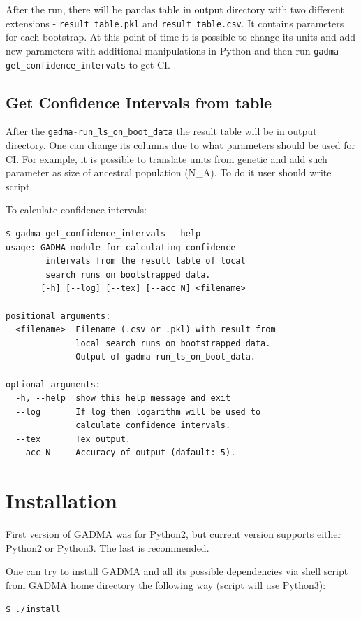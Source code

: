 \documentclass[12pt]{article}
\makeatletter
\newcommand{\py}[1]{\lstinline[language=Python, showstringspaces=False]@#1@}
\makeatother
\begin{document}
After the run, there will be pandas table in output directory with two different extensions - \py{result_table.pkl} and \py{result_table.csv}. It contains parameters for each bootstrap. At this point of time it is possible to change its units and add new parameters with additional manipulations in Python and then run \py{gadma-get_confidence_intervals} to get CI.

\subsection{Get Confidence Intervals from table}
After the \py{gadma-run_ls_on_boot_data} the result table will be in output directory. One can change its columns due to what parameters should be used for CI. For example, it is possible to translate units from genetic and add such parameter as size of ancestral population (N\_A). To do it user should write script.

To calculate confidence intervals:
\begin{lstlisting}
$ gadma-get_confidence_intervals --help
usage: GADMA module for calculating confidence 
        intervals from the result table of local 
        search runs on bootstrapped data.
       [-h] [--log] [--tex] [--acc N] <filename>

positional arguments:
  <filename>  Filename (.csv or .pkl) with result from 
              local search runs on bootstrapped data. 
              Output of gadma-run_ls_on_boot_data.

optional arguments:
  -h, --help  show this help message and exit
  --log       If log then logarithm will be used to
              calculate confidence intervals.
  --tex       Tex output.
  --acc N     Accuracy of output (dafault: 5).
\end{lstlisting}



\newpage
\section{Installation}
First version of GADMA was for Python2, but current version supports either Python2 or Python3. The last is recommended.

One can try to install GADMA and all its possible dependencies via shell script from GADMA home directory the following way (script will use Python3):
\begin{lstlisting}
$ ./install
\end{lstlisting}
\end{document}
